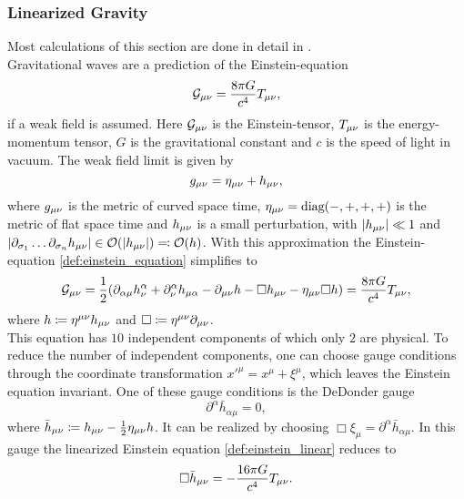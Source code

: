 \subsubsection{Linearized Gravity}\label{sec:linearized_gravity}
Most calculations of this section are done in detail in \cite{bachelor}.\\
Gravitational waves are a prediction of the Einstein-equation
\begin{equation}\label{def:einstein_equation}
\mathcal{G}_{\mu\nu} = \frac{8\pi G}{c^4}T_{\mu\nu},
\end{equation}
if a weak field is assumed. Here $\mathcal{G}_{\mu\nu}$ is the Einstein-tensor, $T_{\mu\nu}$ is the energy-momentum tensor, $G$ is the gravitational constant and $c$ is the speed of light in vacuum. The weak field limit is given by
\begin{equation}\label{def:linear_approximation}
g_{\mu\nu} = \eta_{\mu\nu} + h_{\mu\nu},
\end{equation}
where $g_{\mu\nu}$ is the metric of curved space time, $\eta_{\mu\nu}=\text{diag}{\left( -,+,+,+ \right)}$ is the metric of flat space time and $h_{\mu\nu}$ is a small perturbation, with $\left|h_{\mu\nu}\right|\ll 1$ and $\left|\partial_{\sigma_1}\dotsc\partial_{\sigma_n}h_{\mu\nu}\right|\in\mathcal{O}{\left( \left|h_{\mu\nu}\right| \right)}\eqqcolon\mathcal{O}{\left( h \right)}$. With this approximation the Einstein-equation \eqref{def:einstein_equation} simplifies to
\begin{equation}\label{def:einstein_linear}
\mathcal{G}_{\mu\nu}=\frac{1}{2}{\left( \partial_{\alpha\mu}h^\alpha_\nu+\partial^\alpha_\nu h_{\mu\alpha} - \partial_{\mu\nu} h- \Box h_{\mu\nu} - \eta_{\mu\nu}\Box h \right)} = \frac{8\pi G}{c^4}T_{\mu\nu},
\end{equation}
where $h\coloneqq\eta^{\mu\nu} h_{\mu\nu}$ and $\Box\coloneqq\eta^{\mu\nu}\partial_{\mu\nu}$.\\
This equation has $10$ independent components of which only $2$ are physical. To reduce the number of independent components, one can choose gauge conditions through the coordinate transformation ${x'}^\mu=x^\mu+\xi^\mu$, which leaves the Einstein equation invariant. One of these gauge conditions is the DeDonder gauge
\begin{equation}
\partial^\alpha \bar{h}_{\alpha\mu} = 0,
\end{equation}
where $\bar{h}_{\mu\nu}\coloneqq h_{\mu\nu} - \frac{1}{2}\eta_{\mu\nu} h$. It can be realized by choosing $\Box\xi_\mu =\partial^\alpha \bar{h}_{\alpha\mu}$. In this gauge the linearized Einstein equation \eqref{def:einstein_linear} reduces to
\begin{equation}\label{def:gw_equation}
\Box\bar{h}_{\mu\nu}=-\frac{16\pi G}{c^4}T_{\mu\nu}.
\end{equation}
